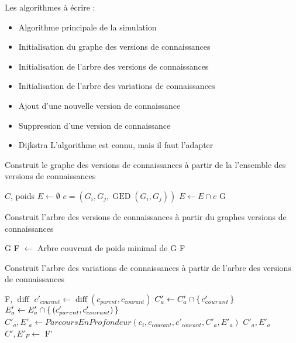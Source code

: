 \documentclass[a4paper]{article}
\newcommand{\comment}{}
\DeclareMathOperator{\poids}{GED}
\DeclareMathOperator{\diff}{diff}
\DeclareMathOperator{\enfants}{enfants}
\begin{document}
Les algorithmes à écrire :

\begin{itemize}
  \item Algorithme principale de la simulation
  \item Initialisation du graphe des versions de connaissances
  \item Initialisation de l'arbre des versions de connaissances
  \item Initialisation de l'arbre des variations de connaissances
  \item Ajout d'une nouvelle version de connaissance
  \item Suppression d'une version de connaissance
  \item Dijkstra \comment{L'algorithme est connu, mais il faut l'adapter}
\end{itemize}

\begin{algorithm}
  \caption{Construit le graphe des versions de connaissances à partir de la
  l'ensemble des versions de connaissances}
  \begin{algorithmic}
    \Require $C$, \gls{poids}
      \State $E \gets \emptyset$
        \State $e = (G_i, G_j, \poids(G_i,G_j))$
        \State $E \gets E \cap {e}$
      \EndFor
      \State \Return \gls{G}
    \EndFunction
  \end{algorithmic}
\end{algorithm}

\begin{algorithm}
  \caption{Construit l'arbre des versions de connaissances à partir du graphes
  versions de connaissances}
  \begin{algorithmic}
    \Require \gls{G}
      \State \gls{F} $\gets$ Arbre couvrant de poids minimal de \gls{G}
      \State \Return \gls{F}
    \EndFunction
  \end{algorithmic}
\end{algorithm}

\begin{algorithm}
  \caption{Construit l'arbre des variations de connaissances à partir de l'arbre
  des versions de connaissances}
  \begin{algorithmic}
    \Require \gls{F}, $\diff$
        \State $c'_{courant} \gets \diff(c_{parent}, c_{courant})$
        \State $C'_a \gets C'_a \cap \set{c'_{courant}}$
        \State $E'_a \gets E'_a \cap \set{(c'_{parent}, c'_{courant})}$
        \For{$c_i \in \enfants(c_{courant})$}{}
          \State $C'_a, E'_a \gets ParcoursEnProfondeur(c_i, c_{courant},
          c'_{courant}, C'_a, E'_a)$
        \EndFor
        \State \Return $C'_a, E'_a$
      \EndFunction
      \State $C', E'_F \gets$ 
      \State \Return \gls{F'}
    \EndFunction
  \end{algorithmic}
\end{algorithm}
\end{document}
